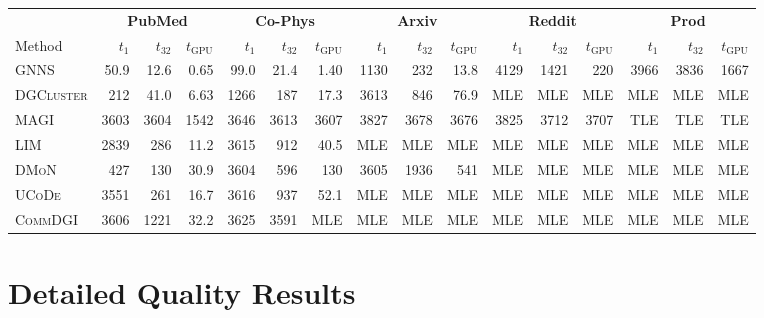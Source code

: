 \documentclass[11pt,a4paper]{article}
\begin{document}
\begin{table}[H]
    \vspace{0.8em}

    \begin{tabular*}{\textwidth}{@{\extracolsep{\fill}}l rrr rrr rrr rrr rrr@{}}
        \toprule
        & \multicolumn{3}{c}{\textbf{PubMed}} & \multicolumn{3}{c}{\textbf{Co-Phys}} & \multicolumn{3}{c}{\textbf{Arxiv}} & \multicolumn{3}{c}{\textbf{Reddit}} & \multicolumn{3}{c}{\textbf{Prod}} \\
        \cmidrule(lr){2-4} \cmidrule(lr){5-7} \cmidrule(lr){8-10} \cmidrule(lr){11-13} \cmidrule(lr){14-16}
        Method & $t_1$ & $t_{32}$ & $t_{\text{GPU}}$ & $t_1$ & $t_{32}$ & $t_{\text{GPU}}$ & $t_1$ & $t_{32}$ & $t_{\text{GPU}}$ & $t_1$ & $t_{32}$ & $t_{\text{GPU}}$ & $t_1$ & $t_{32}$ & $t_{\text{GPU}}$ \\
        \midrule
        \textsc{GNNS}      & 50.9 & 12.6 & 0.65 & 99.0 & 21.4 & 1.40 & 1130 & 232  & 13.8 & 4129 & 1421 & 220  & 3966 & 3836 & 1667 \\
        \textsc{DGCluster} & 212  & 41.0 & 6.63 & 1266 & 187  & 17.3 & 3613 & 846  & 76.9 & MLE  & MLE  & MLE  & MLE  & MLE  & MLE \\
        \textsc{MAGI}      & 3603 & 3604 & 1542 & 3646 & 3613 & 3607 & 3827 & 3678 & 3676 & 3825 & 3712 & 3707 & TLE  & TLE  & TLE \\
        \textsc{LIM}       & 2839 & 286  & 11.2 & 3615 & 912  & 40.5 & MLE  & MLE  & MLE  & MLE  & MLE  & MLE  & MLE  & MLE  & MLE \\
        \textsc{DMoN}      & 427  & 130  & 30.9 & 3604 & 596  & 130  & 3605 & 1936 & 541  & MLE  & MLE  & MLE  & MLE  & MLE  & MLE \\
        \textsc{UCoDe}     & 3551 & 261  & 16.7 & 3616 & 937  & 52.1 & MLE  & MLE  & MLE  & MLE  & MLE  & MLE  & MLE  & MLE  & MLE \\
        \textsc{CommDGI}   & 3606 & 1221 & 32.2 & 3625 & 3591 & MLE  & MLE  & MLE  & MLE  & MLE  & MLE  & MLE  & MLE  & MLE  & MLE \\
        \bottomrule
    \end{tabular*}
\end{table}

\section*{Detailed Quality Results}
\label{sec:detailed-results}
\end{document}
